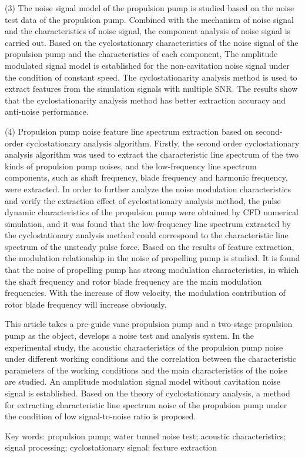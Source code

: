 (3) 
The noise signal model of the propulsion pump is studied based on the noise test data of the propulsion pump. 
Combined with the mechanism of noise signal and the characteristics of noise signal, the component analysis of noise signal is carried out.
Based on the cyclostationary characteristics of the noise signal of the propulsion pump and the characteristics of each component, 
The amplitude modulated signal model is established for the non-cavitation noise signal 
under the condition of constant speed. 
The cyclostationarity analysis method is used to extract features 
from the simulation signals with multiple SNR. 
The results show that the cyclostationarity analysis method
has better extraction accuracy and anti-noise performance.

(4) Propulsion pump noise feature line spectrum extraction based on second-order cyclostationary analysis algorithm. 
Firstly, the second order cyclostationary analysis algorithm was used to extract the characteristic line spectrum of the two kinds of propulsion pump noises, 
and the low-frequency line spectrum components, such as shaft frequency, blade frequency and harmonic frequency, were extracted. 
In order to further analyze the noise modulation characteristics and verify the extraction effect of cyclostationary analysis method,
 the pulse dynamic characteristics of the propulsion pump were obtained by CFD numerical simulation, 
 and it was found that the low-frequency line spectrum extracted by the cyclostationary analysis method could correspond to the characteristic line spectrum of the unsteady pulse force. 
 Based on the results of feature extraction, 
 the modulation relationship in the noise of propelling pump is studied. 
 It is found that the noise of propelling pump has strong modulation characteristics, 
 in which the shaft frequency and rotor blade frequency are the main modulation frequencies. 
 With the increase of flow velocity, the modulation contribution of rotor blade frequency will increase obviously.

 This article takes a pre-guide vane propulsion pump and a two-stage propulsion pump as the object, 
 develops a noise test and analysis system.
 In the experimental study, the acoustic characteristics of the propulsion pump noise under different working conditions 
 and the correlation between the characteristic parameters of the working conditions and the main characteristics of the noise are studied. 
 An amplitude modulation signal model without cavitation noise signal is established. 
 Based on the theory of cyclostationary analysis, a method for extracting characteristic line spectrum noise of the propulsion pump under the condition of low signal-to-noise ratio is proposed.

 \quad

Key words: propulsion pump; water tunnel noise test; acoustic characteristics; signal processing; 
cyclostationary signal; feature extraction